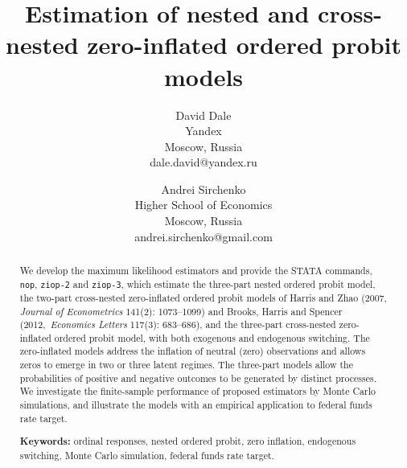 \documentclass[letterpaper,fleqn,12pt]{article}
\begin{document}
\title{Estimation of nested and cross-nested zero-inflated ordered probit
models\\
\bigskip }
\date{}
\author{David Dale \\
Yandex\\
Moscow, Russia\\
dale.david@yandex.ru \and Andrei Sirchenko \\
Higher School of Economics\\
Moscow, Russia\\
andrei.sirchenko@gmail.com}
\maketitle

\begin{abstract}
We develop the maximum likelihood estimators and provide the STATA commands, 
\texttt{nop}, \texttt{ziop-2} and \texttt{ziop-3}, which estimate the
three-part nested ordered probit model, the two-part cross-nested
zero-inflated ordered probit models of Harris and Zhao (2007, \textit{%
Journal of Econometrics }141(2): 1073--1099) and Brooks, Harris and Spencer
(2012,\ \textit{Economics Letters} 117(3): 683--686), and the three-part
cross-nested zero-inflated ordered probit model, with both exogenous and
endogenous switching. The zero-inflated models address the inflation of
neutral (zero) observations and allows zeros to emerge in two or three
latent regimes. The three-part models allow the probabilities of positive
and negative outcomes to be generated by distinct processes. We investigate
the finite-sample performance of proposed estimators by Monte Carlo
simulations, and illustrate the models with an empirical application to
federal funds rate target.

\bigskip \bigskip \bigskip \bigskip \bigskip \bigskip \bigskip

\bigskip \bigskip \bigskip \bigskip \bigskip \bigskip \bigskip

\bigskip \bigskip \bigskip \bigskip \bigskip \bigskip \bigskip

\textbf{Keywords:} ordinal responses, nested ordered probit, zero inflation,
endogenous switching, Monte Carlo simulation, federal funds rate target.

\bigskip \bigskip \bigskip \bigskip \bigskip
\end{abstract}
\end{document}
